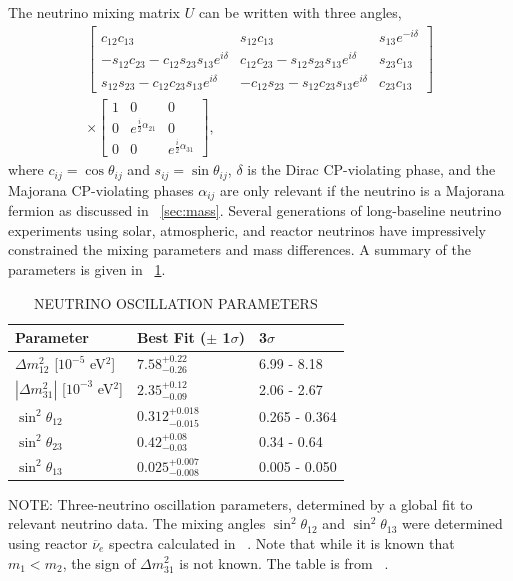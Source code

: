 The neutrino mixing matrix $U$ can be written with three angles,
\begin{multline}
\begin{bmatrix}
c_{12}c_{13} & s_{12}c_{13} & s_{13}e^{-i\delta} \\
-s_{12}c_{23}-c_{12}s_{23}s_{13}e^{i\delta} & c_{12}c_{23}-s_{12}s_{23}s_{13}e^{i\delta} & s_{23}c_{13} \\
s_{12}s_{23}-c_{12}c_{23}s_{13}e^{i\delta} & -c_{12}s_{23}-s_{12}c_{23}s_{13}e^{i\delta} & c_{23}c_{13} 
\end{bmatrix} 
\\
\times 
\begin{bmatrix}
1 & 0 & 0 \\
0 & e^{\frac{i}{2}\alpha_{21}} & 0 \\
0 & 0 & e^{\frac{i}{2}\alpha_{31}}
\end{bmatrix}
,
\end{multline}
where $c_{ij} = \cos{\theta_{ij}}$ and $s_{ij} = \sin{\theta_{ij}}$, $\delta$ is the Dirac CP-violating phase, and the Majorana CP-violating phases $\alpha_{ij}$ are only relevant if the neutrino is a Majorana fermion as discussed in {\sect}~\ref{sec:mass}.  Several generations of long-baseline neutrino experiments using solar, atmospheric, and reactor neutrinos have impressively constrained the mixing parameters and mass differences.  A summary of the parameters is given in {\tab}~\ref{tab:neutrinoParameters}.
\begin{table}
\begin{center}
\caption[\uppercase{Neutrino oscillation parameters}]{\uppercase{Neutrino oscillation parameters} \label{tab:neutrinoParameters}}
\begin{tabular}{lll}\toprule
Parameter & Best Fit ($\pm$ 1$\sigma$) & 3$\sigma$ \\
\midrule
${\Delta}m^2_{12}$ [$10^{-5}$ eV$^2$] & $7.58^{+0.22}_{-0.26}$ & 6.99 - 8.18 \\
$|{\Delta}m^2_{31}|$ [$10^{-3}$ eV$^2$] & $2.35^{+0.12}_{-0.09}$ & 2.06 - 2.67 \\
$\sin^2{\theta_{12}}$ & $0.312^{+0.018}_{-0.015}$ & 0.265 - 0.364 \\  
$\sin^2{\theta_{23}}$ & $0.42^{+0.08}_{-0.03}$ & 0.34 - 0.64 \\  
$\sin^2{\theta_{13}}$ & $0.025^{+0.007}_{-0.008}$ & 0.005 - 0.050 \\   
\bottomrule  
\end{tabular}
\begin{flushleft}
\small NOTE: 
Three-neutrino oscillation parameters, determined by a global fit to relevant neutrino data.   The mixing angles $\sin^2{\theta_{12}}$ and $\sin^2{\theta_{13}}$ were determined using reactor $\overline{\nu}_e$ spectra calculated in {}~\citep{reactorNeutrinoSpectrum}.  Note that while it is known that $m_1 < m_2$, the sign of ${\Delta}m^2_{31}$ is not known.  The table is from {}~\citep{PDG}.
\end{flushleft}
\end{center}
\end{table}
